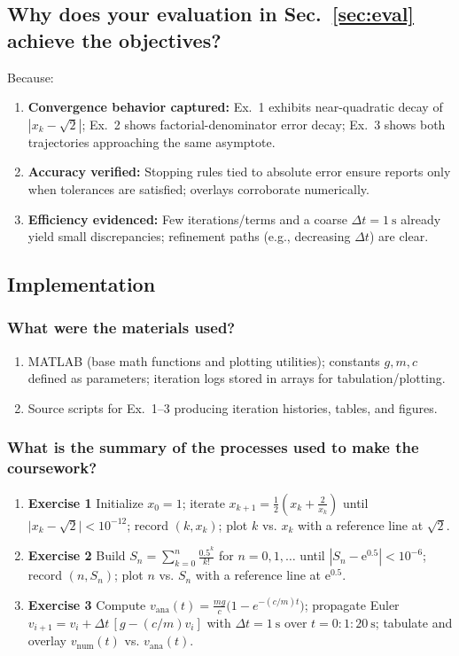 \subsection{Why does your evaluation in Sec.~\ref{sec:eval}  achieve the objectives?}
Because:
\begin{enumerate}
  \item \textbf{Convergence behavior captured:} Ex.~1 exhibits near-quadratic decay of
  \(|x_k-\sqrt{2}|\); Ex.~2 shows factorial-denominator error decay; Ex.~3 shows both trajectories
  approaching the same asymptote.
  \item \textbf{Accuracy verified:} Stopping rules tied to absolute error ensure reports only when
  tolerances are satisfied; overlays corroborate numerically.
  \item \textbf{Efficiency evidenced:} Few iterations/terms and a coarse \(\Delta t=1~\mathrm{s}\)
  already yield small discrepancies; refinement paths (e.g., decreasing \(\Delta t\)) are clear.
\end{enumerate}



\subsection{Implementation}
\label{sec:implem}

\subsubsection{What were the materials used?}
\begin{enumerate}
  \item MATLAB (base math functions and plotting utilities); constants \(g, m, c\) defined as
  parameters; iteration logs stored in arrays for tabulation/plotting.
  \item Source scripts for Ex.~1–3 producing iteration histories, tables, and figures.
\end{enumerate}


\subsubsection{What is the summary of the processes used to make the coursework?}
\begin{enumerate}
  \item \textbf{Exercise 1} Initialize \(x_0=1\); iterate
  \(x_{k+1}=\tfrac12\!\left(x_k+\tfrac{2}{x_k}\right)\) until
  \(\bigl|x_k-\sqrt{2}\bigr|<10^{-12}\); record \((k,x_k)\); plot \(k\) vs. \(x_k\) with a reference line at \(\sqrt{2}\).
  \item \textbf{Exercise 2} Build \(S_n=\sum_{k=0}^{n}\tfrac{0.5^{k}}{k!}\)
  for \(n=0,1,\dots\) until \(|S_n-\mathrm{e}^{0.5}|<10^{-6}\); record \((n,S_n)\); plot \(n\) vs. \(S_n\) with
  a reference line at \(\mathrm{e}^{0.5}\).
  \item \textbf{Exercise 3} Compute
  \(v_{\mathrm{ana}}(t)=\tfrac{mg}{c}\bigl(1-e^{-(c/m)t}\bigr)\); propagate Euler
  \(v_{i+1}=v_i+\Delta t\,[g-(c/m)v_i]\) with \(\Delta t=1~\mathrm{s}\) over \(t=0{:}1{:}20~\mathrm{s}\);
  tabulate and overlay \(v_{\mathrm{num}}(t)\) vs. \(v_{\mathrm{ana}}(t)\).
\end{enumerate}

